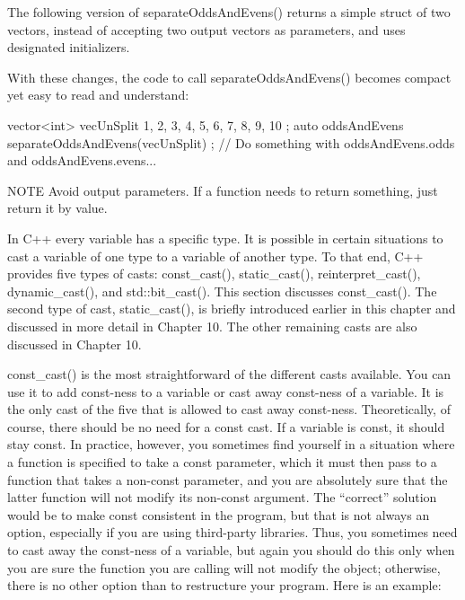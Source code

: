 The following version of separateOddsAndEvens() returns a simple struct of two vectors, instead of accepting two output vectors as parameters, and uses designated initializers.


With these changes, the code to call separateOddsAndEvens() becomes compact yet easy to read and understand:

\begin{cpp}
vector<int> vecUnSplit { 1, 2, 3, 4, 5, 6, 7, 8, 9, 10 };
auto oddsAndEvens { separateOddsAndEvens(vecUnSplit) };
// Do something with oddsAndEvens.odds and oddsAndEvens.evens...
\end{cpp}

\begin{myNotic}{NOTE}
Avoid output parameters. If a function needs to return something, just return it by value.
\end{myNotic}


In C++ every variable has a specific type. It is possible in certain situations to cast a variable of one type to a variable of another type. To that end, C++ provides five types of casts: const\_cast(), static\_cast(), reinterpret\_cast(), dynamic\_cast(), and std::bit\_cast(). This section discusses const\_cast(). The second type of cast, static\_cast(), is briefly introduced earlier in this chapter and discussed in more detail in Chapter 10. The other remaining casts are also discussed in Chapter 10.

const\_cast() is the most straightforward of the different casts available. You can use it to add const-ness to a variable or cast away const-ness of a variable. It is the only cast of the five that is allowed to cast away const-ness. Theoretically, of course, there should be no need for a const cast. If a variable is const, it should stay const. In practice, however, you sometimes find yourself in a situation where a function is specified to take a const parameter, which it must then pass to a function that takes a non-const parameter, and you are absolutely sure that the latter function will not modify its non-const argument. The “correct” solution would be to make const consistent in the program, but that is not always an option, especially if you are using third-party libraries. Thus, you sometimes need to cast away the const-ness of a variable, but again you should do this only when you are sure the function you are calling will not modify the object; otherwise, there is no other option than to restructure your program. Here is an example:

